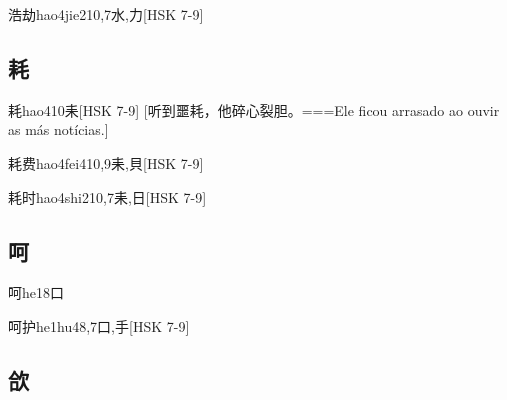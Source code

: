 \begin{EntryWithPhonetic}{浩劫}{hao4jie2}{10,7}{⽔,⼒}[HSK 7-9]
\end{EntryWithPhonetic}

\subsection*{耗}

\begin{EntryWithPhonetic}{耗}{hao4}{10}{⽾}[HSK 7-9]
  [听到噩耗，他碎心裂胆。===Ele ficou arrasado ao ouvir as más notícias.]
\end{EntryWithPhonetic}

\begin{EntryWithPhonetic}{耗费}{hao4fei4}{10,9}{⽾,⾙}[HSK 7-9]
\end{EntryWithPhonetic}

\begin{EntryWithPhonetic}{耗时}{hao4shi2}{10,7}{⽾,⽇}[HSK 7-9]
\end{EntryWithPhonetic}

\subsection*{呵}

\begin{EntryWithPhonetic}{呵}{he1}{8}{⼝}
\end{EntryWithPhonetic}

\begin{EntryWithPhonetic}{呵护}{he1hu4}{8,7}{⼝,⼿}[HSK 7-9]
\end{EntryWithPhonetic}

\subsection*{欱}

